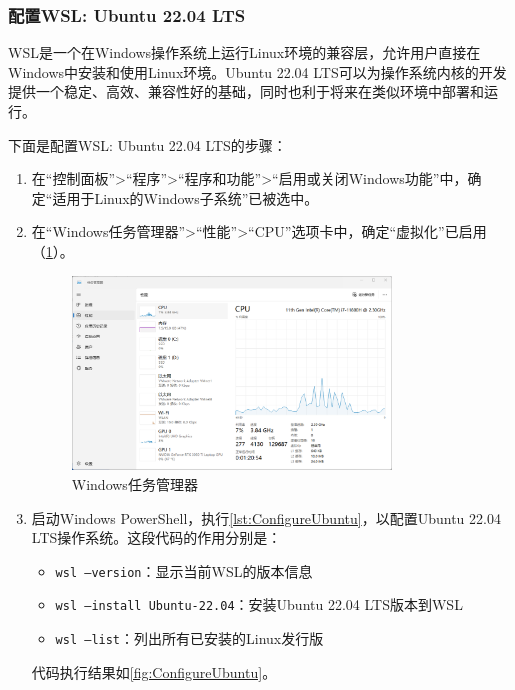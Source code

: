 \subsubsection{配置WSL: Ubuntu 22.04 LTS}

WSL是一个在Windows操作系统上运行Linux环境的兼容层，允许用户直接在Windows中安装和使用Linux环境。Ubuntu 22.04 LTS可以为操作系统内核的开发提供一个稳定、高效、兼容性好的基础，同时也利于将来在类似环境中部署和运行。

下面是配置WSL: Ubuntu 22.04 LTS的步骤：

\begin{enumerate}
    \item 在“控制面板”>“程序”>“程序和功能”>“启用或关闭Windows功能”中，确定“适用于Linux的Windows子系统”已被选中。
    \item 在“Windows任务管理器”>“性能”>“CPU”选项卡中，确定“虚拟化”已启用（\cref{fig:WindowsTaskManager}）。
          \begin{figure}[htbp]
              \centering
              \includegraphics[width=0.8\textwidth]{figures/WindowsTaskManager.png}
              \caption{Windows任务管理器}
              \label{fig:WindowsTaskManager}
          \end{figure}
    \item 启动Windows PowerShell，执行\cref{lst:ConfigureUbuntu}，以配置Ubuntu 22.04 LTS操作系统。这段代码的作用分别是：
          \begin{itemize}
              \item \texttt{wsl --version}：显示当前WSL的版本信息
              \item \texttt{wsl --install Ubuntu-22.04}：安装Ubuntu 22.04 LTS版本到WSL
              \item \texttt{wsl --list}：列出所有已安装的Linux发行版
          \end{itemize}
          代码执行结果如\cref{fig:ConfigureUbuntu}。
          \begin{listing}[htbp]

\end{listing}
\end{enumerate}
